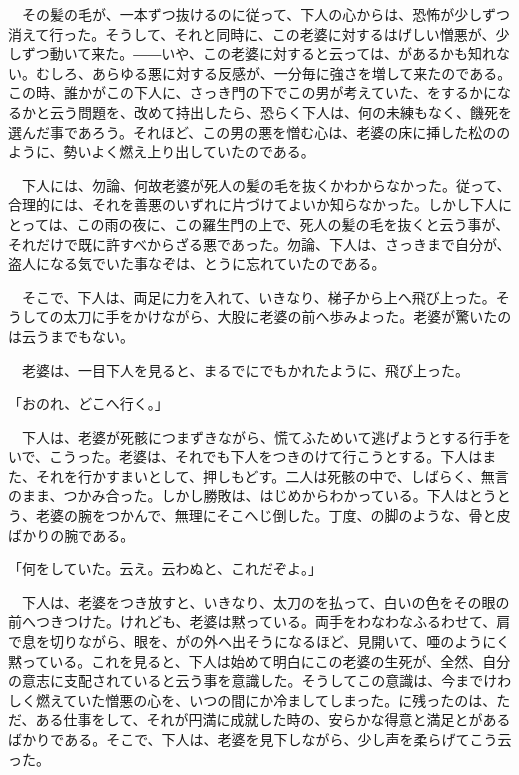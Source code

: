 \documentclass[a4j,twocolumn]{tarticle}
\begin{document}
　その髪の毛が、一本ずつ抜けるのに従って、下人の心からは、恐怖が少しずつ消えて行った。そうして、それと同時に、この老婆に対するはげしい憎悪が、少しずつ動いて来た。――いや、この老婆に対すると云っては、があるかも知れない。むしろ、あらゆる悪に対する反感が、一分毎に強さを増して来たのである。この時、誰かがこの下人に、さっき門の下でこの男が考えていた、をするかになるかと云う問題を、改めて持出したら、恐らく下人は、何の未練もなく、饑死を選んだ事であろう。それほど、この男の悪を憎む心は、老婆の床に挿した松ののように、勢いよく燃え上り出していたのである。\par{}
　下人には、勿論、何故老婆が死人の髪の毛を抜くかわからなかった。従って、合理的には、それを善悪のいずれに片づけてよいか知らなかった。しかし下人にとっては、この雨の夜に、この羅生門の上で、死人の髪の毛を抜くと云う事が、それだけで既に許すべからざる悪であった。勿論、下人は、さっきまで自分が、盗人になる気でいた事なぞは、とうに忘れていたのである。\par{}
　そこで、下人は、両足に力を入れて、いきなり、梯子から上へ飛び上った。そうしての太刀に手をかけながら、大股に老婆の前へ歩みよった。老婆が驚いたのは云うまでもない。\par{}
　老婆は、一目下人を見ると、まるでにでもかれたように、飛び上った。\par{}
「おのれ、どこへ行く。」\par{}
　下人は、老婆が死骸につまずきながら、慌てふためいて逃げようとする行手をいで、こうった。老婆は、それでも下人をつきのけて行こうとする。下人はまた、それを行かすまいとして、押しもどす。二人は死骸の中で、しばらく、無言のまま、つかみ合った。しかし勝敗は、はじめからわかっている。下人はとうとう、老婆の腕をつかんで、無理にそこへじ倒した。丁度、の脚のような、骨と皮ばかりの腕である。\par{}
「何をしていた。云え。云わぬと、これだぞよ。」\par{}
　下人は、老婆をつき放すと、いきなり、太刀のを払って、白いの色をその眼の前へつきつけた。けれども、老婆は黙っている。両手をわなわなふるわせて、肩で息を切りながら、眼を、がの外へ出そうになるほど、見開いて、唖のようにく黙っている。これを見ると、下人は始めて明白にこの老婆の生死が、全然、自分の意志に支配されていると云う事を意識した。そうしてこの意識は、今までけわしく燃えていた憎悪の心を、いつの間にか冷ましてしまった。に残ったのは、ただ、ある仕事をして、それが円満に成就した時の、安らかな得意と満足とがあるばかりである。そこで、下人は、老婆を見下しながら、少し声を柔らげてこう云った。\par{}
\end{document}

